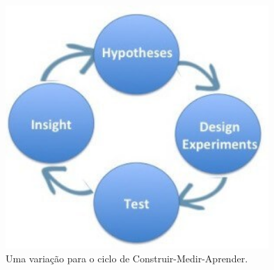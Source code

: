 \begin{figure}[htb]
\centering
\includegraphics[width=10cm]{figuras/hypotheses-experiment}
\caption{\label{fig:hypotheses-experiment} Uma variação para o ciclo de Construir-Medir-Aprender.}
\end{figure}

